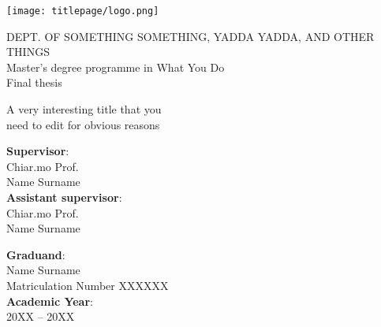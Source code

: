 
\begin{titlepage}


\begin{addmargin}[-1cm]{-3cm}

\texttt{[image: titlepage/logo.png]}

\vspace{16mm}

\begin{center}
{\small{\MakeUppercase{Dept. of Something Something, Yadda Yadda, and Other things}\\Master's degree programme in What You Do}}\\
\vspace{21mm}
{\small{Final thesis}}
\end{center}

\vspace{21mm}
\begin{center}
{\LARGE{ A very interesting title that you }}\\
\vspace{3mm}
{\LARGE{  need to edit for obvious reasons}}\\
\vspace{55mm} 
\end{center}

\par
\noindent
\begin{minipage}[t]{0.47\textwidth}
{\large{ \textbf{Supervisor}:\\Chiar.mo Prof.\\Name Surname}}\\

{\large{\textbf{Assistant supervisor}:\\Chiar.mo Prof.\\ Name Surname}}
\end{minipage}
\hfill
\begin{minipage}[t]{0.47\textwidth}\raggedleft
{\large{ \textbf{Graduand}:\\Name Surname\\Matriculation Number XXXXXX}}\\
\vspace{3mm}
{\large{ \textbf{Academic Year}:\\ 20XX -- 20XX}}
\end{minipage}

\vspace{20mm}

\end{addmargin}
\end{titlepage}